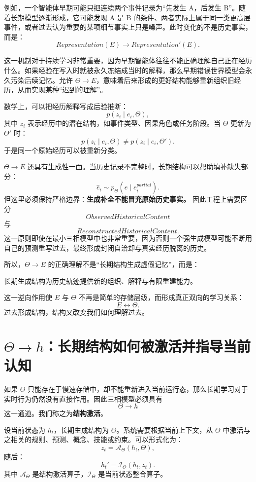 例如，一个智能体早期可能只把连续两个事件记录为“先发生 A，后发生 B”。随着长期模型逐渐形成，它可能发现 A 是 B 的条件、两者实际上属于同一类更高层事件，或者过去认为重要的某项细节事实上只是噪声。此时变化的不是历史事实，而是：
\[
Representation(E)
\rightarrow
Representation'(E).
\]

这一机制对于持续学习非常重要，因为早期智能体往往不能正确理解自己正在经历什么。如果经验在写入时就被永久冻结成当时的解释，那么早期错误世界模型会永久污染后续记忆。允许 $\Theta\rightarrow E$，意味着后来形成的更好结构能够重新组织旧经历，从而实现某种“迟到的理解”。

数学上，可以把经历解释写成后验推断：
\[
p(z_i\mid e_i,\Theta),
\]
其中 $z_i$ 表示经历中的潜在结构，如事件类型、因果角色或任务阶段。当 $\Theta$ 更新为 $\Theta'$ 时：
\[
p(z_i\mid e_i,\Theta)
\neq
p(z_i\mid e_i,\Theta').
\]
于是同一个原始经历可以被重新分类。

$\Theta\rightarrow E$ 还具有生成性一面。当历史记录不完整时，长期结构可以帮助填补缺失部分：
\[
\hat e_i
\sim
p_\Theta(e\mid e_i^{partial}).
\]
但这里必须保持严格边界：\textbf{生成补全不能冒充原始历史事实。} 因此工程上需要区分
\[
ObservedHistoricalContent
\]
与
\[
ReconstructedHistoricalContent.
\]
这一原则即使在最小三相模型中也非常重要，因为否则一个强生成模型可能不断用自己的预测重写过去，最终形成封闭自洽却与真实经历脱离的历史。

所以，$\Theta\rightarrow E$ 的正确理解不是“长期结构生成虚假记忆”，而是：
\begin{statementbox}
长期生成结构为历史轨迹提供新的组织、解释与有限重建能力。
\end{statementbox}
这一逆向作用使 $E$ 与 $\Theta$ 不再是简单的存储层级，而形成真正双向的学习关系：
\[
E
\leftrightarrow
\Theta.
\]
过去形成结构，结构又改变我们如何理解过去。

\section{$\Theta\rightarrow h$：长期结构如何被激活并指导当前认知}

如果 $\Theta$ 只能存在于慢速存储中，却不能重新进入当前运行态，那么长期学习对于实时行为仍然没有直接作用。因此三相模型必须具有
\[
\boxed{
\Theta\rightarrow h
}
\]
这一通道。我们称之为\textbf{结构激活}。

设当前状态为 $h_t$，长期生成结构为 $\Theta$。系统需要根据当前上下文，从 $\Theta$ 中激活与之相关的规则、预测、概念、技能或约束。可以形式化为：
\[
z_t
=
\mathcal A_\Theta
\left(
h_t,\Theta
\right),
\]
随后：
\[
h_t'
=
\mathcal I_\Theta
\left(
h_t,z_t
\right).
\]
其中 $\mathcal A_\Theta$ 是结构激活算子，$\mathcal I_\Theta$ 是当前状态整合算子。

